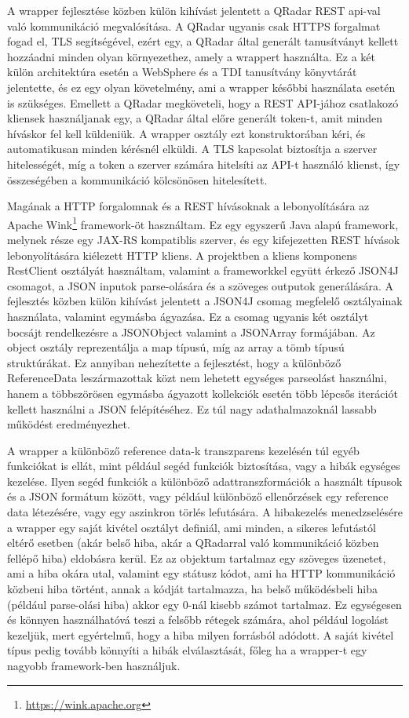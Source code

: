 A wrapper fejlesztése közben külön kihívást jelentett a QRadar REST api-val való kommunikáció megvalósítása. A QRadar ugyanis csak HTTPS forgalmat fogad el, TLS segítségével, ezért egy, a QRadar által generált tanusítványt kellett hozzáadni minden olyan környezethez, amely a wrappert használta. Ez a két külön architektúra esetén a WebSphere és a TDI tanusítvány könyvtárát jelentette, és ez egy olyan követelmény, ami a wrapper későbbi használata esetén is szükséges. Emellett a QRadar megköveteli, hogy a REST API-jához csatlakozó kliensek használjanak egy, a QRadar által előre generált token-t, amit minden híváskor fel kell küldeniük. A wrapper osztály ezt konstruktorában kéri, és automatikusan minden kérésnél elküldi. A TLS kapcsolat biztosítja a szerver hitelességét, míg a token a szerver számára hitelsíti az API-t használó klienst, így összeségében a kommunikáció kölcsönösen hitelesített.

Magának a HTTP forgalomnak és a REST hívásoknak a lebonyolítására az Apache Wink\footnote{\hyperlink{Apache Wink}{\url{https://wink.apache.org}}} framework-öt használtam. Ez egy egyszerű Java alapú framework, melynek része egy JAX-RS kompatiblis szerver, és egy kifejezetten REST hívások lebonyolítására kiélezett HTTP kliens. A projektben a kliens komponens RestClient osztályát használtam, valamint a frameworkkel együtt érkező JSON4J csomagot, a JSON inputok parse-olására és a szöveges outputok generálására. A fejlesztés közben külön kihívást jelentett a JSON4J csomag megfelelő osztályainak használata, valamint egymásba ágyazása. Ez a csomag ugyanis két osztályt bocsájt rendelkezésre a JSONObject valamint a JSONArray formájában. Az object osztály reprezentálja a map típusú, míg az array a tömb típusú struktúrákat. Ez annyiban nehezítette a fejlesztést, hogy a különböző ReferenceData leszármazottak közt nem lehetett egységes parseolást használni, hanem a többszörösen egymásba ágyazott kollekciók esetén több lépcsős iterációt kellett használni a JSON felépítéséhez. Ez túl nagy adathalmazoknál lassabb működést eredményezhet.

A wrapper a különböző reference data-k transzparens kezelésén túl egyéb funkciókat is ellát, mint például segéd funkciók biztosítása, vagy a hibák egységes kezelése. Ilyen segéd funkciók a különböző adattranszformációk a használt típusok és a JSON formátum között, vagy például különböző ellenőrzések egy reference data létezésére, vagy egy aszinkron törlés lefutására. A hibakezelés menedzselésére a wrapper egy saját kivétel osztályt definiál, ami minden, a sikeres lefutástól eltérő esetben (akár belső hiba, akár a QRadarral való kommunikáció közben fellépő hiba) eldobásra kerül. Ez az objektum tartalmaz egy szöveges üzenetet, ami a hiba okára utal, valamint egy státusz kódot, ami ha HTTP kommunikáció közbeni hiba történt, annak a kódját tartalmazza, ha belső működésbeli hiba (például parse-olási hiba) akkor egy 0-nál kisebb számot tartalmaz. Ez egységesen és könnyen használhatóvá teszi a felsőbb rétegek számára, ahol például logolást kezeljük, mert egyértelmű, hogy a hiba milyen forrásból adódott. A saját kivétel típus pedig tovább könnyíti a hibák elválasztását, főleg ha a wrapper-t egy nagyobb framework-ben használjuk.

